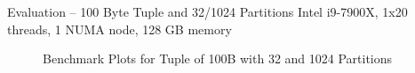 \begin{frame}{Evaluation -- \LARGE 100 Byte Tuple and 32/1024 Partitions}
  Intel i9-7900X, 1x20 threads, 1 NUMA node, 128 GB memory
  \begin{figure}[h]
    \centering
    \begin{subfigure}{.49\textwidth}
      \centering
      \resizebox{\linewidth}{!}{}
    \end{subfigure}
    \begin{subfigure}{.49\textwidth}
      \centering
      \resizebox{\linewidth}{!}{}
    \end{subfigure}
    \begin{subfigure}{\textwidth}
      \centering
      \resizebox{.85\linewidth}{!}{}
    \end{subfigure}
    \caption[Shuffle Benchmark Plots for Tuple of 100B with 32 and 1024 Partitions]{Benchmark Plots for Tuple of 100B with 32 and 1024 Partitions}
    \label{plot-shuffle-100B-32-1024}
  \end{figure}
\end{frame}


